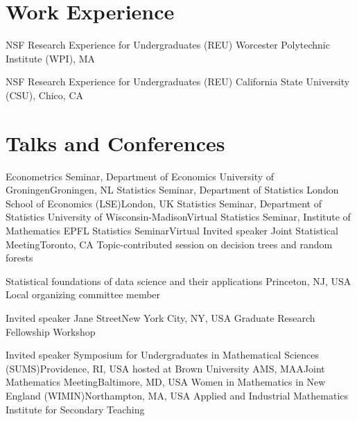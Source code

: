 \documentclass[10pt,a4paper,roman]{moderncv}        %
\begin{document}
\vspace{-0.3cm}
\section{Work Experience}
{NSF Research Experience for Undergraduates (REU) }
{Worcester Polytechnic Institute (WPI), MA}
{} {
}

{NSF Research Experience for Undergraduates (REU)}
{California State University (CSU), Chico, CA}
{}
{}

\vspace{-0.3cm}
\section{Talks and Conferences}
{Econometrics Seminar, Department of Economics}
{University of Groningen}{Groningen, NL}
{}
{}
{Statistics Seminar, Department of Statistics}
{London School of Economics (LSE)}{London, UK}
{}
{}
{Statistics Seminar, Department of Statistics}
{University of Wisconsin-Madison}{Virtual}
{}
{}
{Statistics Seminar, Institute of Mathematics}
{EPFL Statistics Seminar}{Virtual}
{}
{}
{Invited speaker}
{Joint Statistical Meeting}{Toronto, CA}
{Topic-contributed session on decision trees and random forests}
{}

{Statistical foundations of data science and their applications}
{Princeton, NJ, USA}
{}{Local organizing committee member}

{Invited speaker}
{Jane Street}{New York City, NY, USA}
{Graduate Research Fellowship Workshop}
{}

{Invited speaker}
{Symposium for Undergraduates in Mathematical Sciences (SUMS)}{Providence, RI, USA}
{hosted at Brown University}
{}
{AMS, MAA}{Joint Mathematics Meeting}{Baltimore, MD, USA}
{}{}
{Women in Mathematics in New England (WIMIN)}{Northampton, MA, USA}
{}{}
{Applied and Industrial Mathematics Institute for Secondary Teaching}
{}
\end{document}
